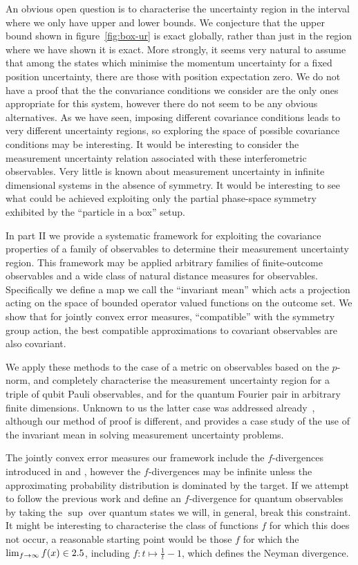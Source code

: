 An obvious open question is to characterise the uncertainty region in the interval where we only have upper and lower bounds. We conjecture that the upper bound shown in figure~\ref{fig:box-ur} is exact globally, rather than just in the region where we have shown it is exact. More strongly, it seems very natural to assume that among the states which minimise the momentum uncertainty for a fixed position uncertainty, there are those with position expectation zero. We do not have a proof that the the convariance conditions we consider are the only ones appropriate for this system, however there do not seem to be any obvious alternatives. As we have seen, imposing different covariance conditions leads to very different uncertainty regions, so exploring the space of possible covariance conditions may be interesting. It would be interesting to consider the measurement uncertainty relation associated with these interferometric observables. Very little is known about measurement uncertainty in infinite dimensional systems in the absence of symmetry. It would be interesting to see what could be achieved exploiting only the partial phase-space symmetry exhibited by the ``particle in a box'' setup.


In part II we provide a systematic framework for exploiting the covariance properties of a family of observables to determine their measurement uncertainty region. This framework may be applied arbitrary families of finite-outcome observables and a wide class of natural distance measures for observables. Specifically we define a map we call the ``invariant mean'' which acts a projection acting on the space of bounded operator valued functions on the outcome set. We show that for jointly convex error measures, ``compatible'' with the symmetry group action, the best compatible approximations to covariant observables are also covariant.

We apply these methods to the case of a metric on observables based on the $p$-norm, and completely characterise the measurement uncertainty region for a triple of qubit Pauli observables, and for the quantum Fourier pair in arbitrary finite dimensions. Unknown to us the latter case was addressed already~\cite{Werner2016}, although our method of proof is different, and provides a case study of the use of the invariant mean in solving measurement uncertainty problems.

The jointly convex error measures our framework include the $f$-divergences introduced in \cite{10.2307/2984279} and \cite{der1964informationstheoretische}, however the $f$-divergences may be infinite unless the approximating probability distribution is dominated by the target. If we attempt to follow the previous work and define an $f$-divergence for quantum observables by taking the $\sup$ over quantum states we will, in general, break this constraint. It might be interesting to characterise the class of functions $f$ for which this does not occur, a reasonable starting point would be those $f$ for which the $\lim_{f\to\infty}f(x) \in 2.5$, including $f:t\mapsto \frac{1}{t}-1$, which defines the Neyman divergence.

